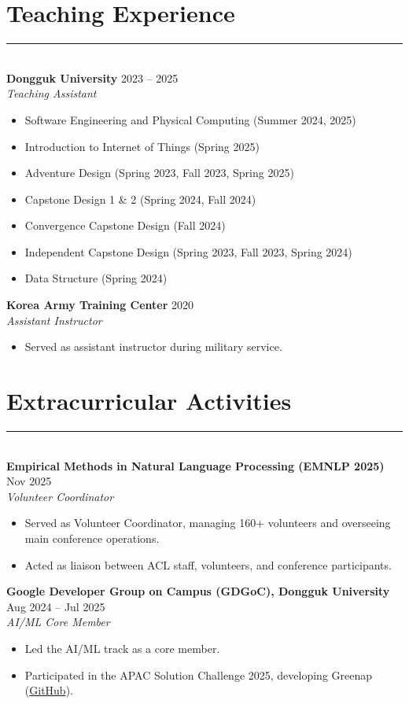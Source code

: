 \documentclass[10pt,letterpaper]{article}
\newcommand{\sectionrule}{\vspace{-0.5em}\rule{\textwidth}{0.4pt}\\[0.2em]}
\newcommand{\cvheader}[1]{{\normalsize\bfseries #1}}
\newcommand{\cvposition}[1]{{\itshape #1}}
\newcommand{\cvdate}[1]{\hfill #1}
\begin{document}
\section{Teaching Experience}
\sectionrule
\cvheader{Dongguk University} \cvdate{2023 -- 2025}\\
\cvposition{Teaching Assistant}
\begin{itemize}
    \item Software Engineering and Physical Computing (Summer 2024, 2025)
    \item Introduction to Internet of Things (Spring 2025)
    \item Adventure Design (Spring 2023, Fall 2023, Spring 2025)
    \item Capstone Design 1 \& 2 (Spring 2024, Fall 2024)
    \item Convergence Capstone Design (Fall 2024)
    \item Independent Capstone Design (Spring 2023, Fall 2023, Spring 2024)
    \item Data Structure (Spring 2024)
\end{itemize}

\vspace{1pt}
\cvheader{Korea Army Training Center} \cvdate{2020}\\
\cvposition{Assistant Instructor}
\begin{itemize}
    \item Served as assistant instructor during military service.
\end{itemize}

\section{Extracurricular Activities}
\sectionrule
\cvheader{Empirical Methods in Natural Language Processing (EMNLP 2025)} \cvdate{Nov 2025}\\
\cvposition{Volunteer Coordinator}
\begin{itemize}
    \item Served as Volunteer Coordinator, managing 160+ volunteers and overseeing main conference operations.
    \item Acted as liaison between ACL staff, volunteers, and conference participants.
\end{itemize}

\vspace{1pt}
\cvheader{Google Developer Group on Campus (GDGoC), Dongguk University} \cvdate{Aug 2024 -- Jul 2025}\\
\cvposition{AI/ML Core Member}
\begin{itemize}
    \item Led the AI/ML track as a core member.
    \item Participated in the APAC Solution Challenge 2025, developing Greenap (\href{https://github.com/bk123477/2025-APAC-SolutionChallenge-Greenap}{GitHub}).
\end{itemize}
\end{document}
